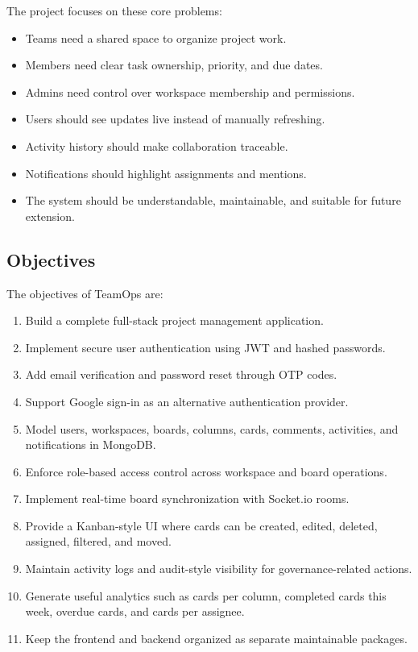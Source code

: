\documentclass[
]{article}
\providecommand{\tightlist}{%
  \setlength{\itemsep}{0pt}\setlength{\parskip}{0pt}}
\begin{document}
The project focuses on these core problems:

\begin{itemize}
\tightlist
\item
  Teams need a shared space to organize project work.
\item
  Members need clear task ownership, priority, and due dates.
\item
  Admins need control over workspace membership and permissions.
\item
  Users should see updates live instead of manually refreshing.
\item
  Activity history should make collaboration traceable.
\item
  Notifications should highlight assignments and mentions.
\item
  The system should be understandable, maintainable, and suitable for
  future extension.
\end{itemize}

\subsection{Objectives}\label{objectives}

The objectives of TeamOps are:

\begin{enumerate}
\def\labelenumi{\arabic{enumi}.}
\tightlist
\item
  Build a complete full-stack project management application.
\item
  Implement secure user authentication using JWT and hashed passwords.
\item
  Add email verification and password reset through OTP codes.
\item
  Support Google sign-in as an alternative authentication provider.
\item
  Model users, workspaces, boards, columns, cards, comments, activities,
  and notifications in MongoDB.
\item
  Enforce role-based access control across workspace and board
  operations.
\item
  Implement real-time board synchronization with Socket.io rooms.
\item
  Provide a Kanban-style UI where cards can be created, edited, deleted,
  assigned, filtered, and moved.
\item
  Maintain activity logs and audit-style visibility for
  governance-related actions.
\item
  Generate useful analytics such as cards per column, completed cards
  this week, overdue cards, and cards per assignee.
\item
  Keep the frontend and backend organized as separate maintainable
  packages.
\end{enumerate}
\end{document}
